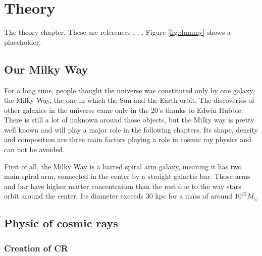 \chapter{Theory}
\label{ch:theory}
The theory chapter. These are references \cite{aPaper}, \cite{aThesis}, \cite{aWiki}. Figure \ref{fig:dummy} shows a placeholder. 
%
%

\section{Our Milky Way}

For a long time, people thought the universe was constituted only by one galaxy, the Milky Way, the one in which the Sun and the Earth orbit. The discoveries of other galaxies in the universe came only in the 20's thanks to Edwin Hubble. There is still a lot of unknown  around those objects, but the Milky way is pretty well known and will play a major role in the following chapters. Its shape, density and composition are three main factors playing a role in cosmic ray physics and can not be avoided.

First of all, the Milky Way is a barred spiral arm galaxy, meaning it has two main spiral arm, connected in the center by a straight galactic bar. Those arms and bar have higher matter concentration than the rest due to the way stars orbit around the center. Its diameter exceeds 30 kpc for a mass of around $10^{12} M_\odot$


\section{Physic of cosmic rays}


\subsection{Creation of CR}


